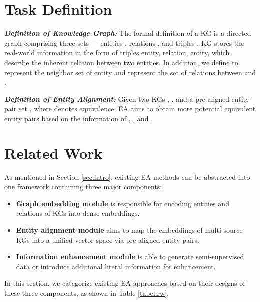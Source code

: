 \documentclass[sigconf]{acmart}
\begin{document}
\section{Task Definition}
\textbf{\emph{Definition of Knowledge Graph:}}
The formal definition of a KG is a directed graph  comprising three sets --- entities , relations , and triples .
KG stores the real-world information in the form of triples entity, relation, entity, which describe the inherent relation between two entities.
In addition, we define  to represent the neighbor set of entity  and  represent the set of relations between  and .

\noindent
\textbf{\emph{Definition of Entity Alignment:}}
Given two KGs , , and a pre-aligned entity pair set , where  denotes equivalence.
EA aims to obtain more potential equivalent entity pairs based on the information of , , and .

\section{Related Work}
\label{sec:rw}
As mentioned in Section \ref{sec:intro}, existing EA methods can be abstracted into one framework containing three major components:
\begin{itemize}
  \item \textbf{Graph embedding module} is responsible for encoding entities and relations of KGs into dense embeddings.
  \item \textbf{Entity alignment module} aims to map the embeddings of multi-source KGs into a unified vector space via pre-aligned entity pairs.
  \item \textbf{Information enhancement module} is able to generate semi-supervised data or introduce additional literal information for enhancement.
\end{itemize}
In this section, we categorize existing EA approaches based on their designs of these three components, as shown in Table \ref{tabel:rw}.
\end{document}
